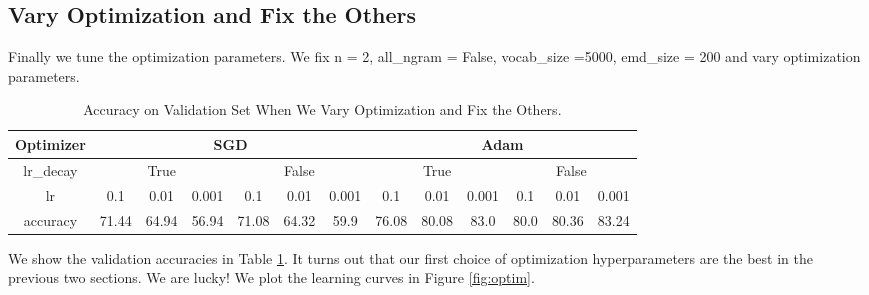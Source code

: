 \documentclass[10pt,a4paper]{article}
\begin{document}
\subsection{Vary Optimization and Fix the Others}
Finally we tune the optimization parameters. We fix n = 2, all\_ngram = False, vocab\_size =5000, emd\_size = 200 and vary optimization parameters.
\begin{table}[!ht]
\centering
\begin{tabular}{|c|c|c|c|c|c|c|c|c|c|c|c|c|}
\hline
Optimizer & \multicolumn{6}{|c|}{SGD} & \multicolumn{6}{|c|}{Adam} \\ \hline
lr\_decay & \multicolumn{3}{|c|}{True}& \multicolumn{3}{|c|}{False} &\multicolumn{3}{|c|}{True}& \multicolumn{3}{|c|}{False}\\ \hline
lr & 0.1 & 0.01 & 0.001 & 0.1 & 0.01 & 0.001 & 0.1 & 0.01 & 0.001 & 0.1 & 0.01 & 0.001\\ \hline
accuracy & 71.44 &64.94 &56.94 &71.08 &64.32 & 59.9&76.08& 80.08& 83.0 &80.0 & 80.36 & 83.24 \\ \hline
\end{tabular}
\caption{\label{tab: optim}Accuracy on Validation Set When We Vary Optimization and Fix the Others.}
\end{table}
We show the validation accuracies in Table \ref{tab: optim}. It turns out that our first choice of optimization hyperparameters are the best in the previous two sections. We are lucky! We plot the learning curves in Figure \ref{fig:optim}.
\end{document}

